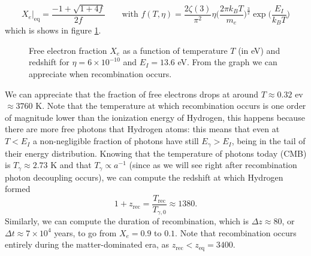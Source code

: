 $$
X_e\bigg|_\text{eq}=\frac{-1+\sqrt{1+4f}}{2f}\qquad \text{with }f(T,\eta)=\frac{2\zeta(3)}{\pi^2}\eta\bigg(\frac{2\pi k_BT}{m_e}\bigg)^{\frac{3}{2}}\exp\bigg({\frac{E_I}{k_BT}}\Bigg)
$$
which is shows in figure \ref{fig:saha}.
\begin{figure}[ht!]
\centering
{}
\caption{Free electron fraction $X_e$ as a function of temperature $T$ (in eV) and redshift for $\eta=6\times10^{-10}$ and $E_I=13.6$ eV. From the graph we can appreciate when recombination occurs.}
\label{fig:saha}
\end{figure}
We can appreciate that the fraction of free electrons drops at around $T\approx 0.32$ ev $\approx3760$ K. 
Note that the temperature at which recombination occurs is one order of magnitude lower than the ionization energy of Hydrogen, this happens because there are more free photons that Hydrogen atoms: this means that even at $T<E_I$ a non-negligible fraction of photons have still $E_\gamma>E_I$, being in the tail of their energy distribution.
Knowing that the temperature of photons today (CMB) is $T_\gamma\approx2.73$ K and that $T_\gamma\propto a^{-1}$ (since as we will see right after recombination photon decoupling occurs), we can compute the redshift at which Hydrogen formed
$$
1+z_\text{rec}=\frac{T_\text{rec}}{T_{\gamma,0}}\approx 1380.
$$
Similarly, we can compute the duration of recombination, which is $\Delta z\approx 80$, or $\Delta t\approx 7\times 10^{4}$ years, to go from $X_e=0.9$ to $0.1$. Note that recombination occurs entirely during the matter-dominated era, as $z_\text{rec}<z_\text{eq}=3400$.


